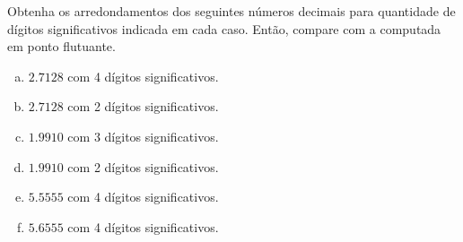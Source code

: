 \begin{exeresol}
  Obtenha os arredondamentos dos seguintes números decimais para quantidade de dígitos significativos indicada em cada caso. Então, compare com a computada em ponto flutuante.
  \begin{enumerate}[a)]
  \item $2.7128$ com 4 dígitos significativos.
  \item $2.7128$ com 2 dígitos significativos.
  \item $1.9910$ com 3 dígitos significativos.
  \item $1.9910$ com 2 dígitos significativos.
  \item $5.5555$ com 4 dígitos significativos.
  \item $5.6555$ com 4 dígitos significativos.
  \end{enumerate}
\end{exeresol}
